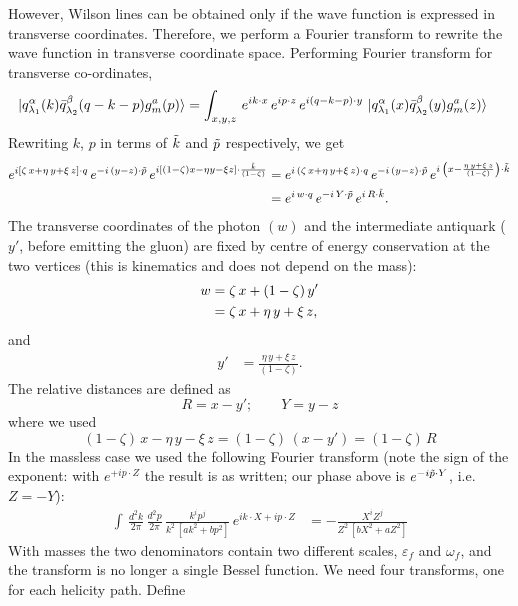 \documentclass[9pt]{article}
\newcommand{\eps}{\varepsilon_{f}}           %
\newcommand{\om}{\omega_{f}}                 %
\numberwithin{equation}{section}
\begin{document}
\begin{enumerate}
However, Wilson lines can be obtained only if the wave function is expressed in transverse coordinates. Therefore, we perform a Fourier transform to rewrite the wave function in transverse coordinate space. Performing Fourier transform for transverse co-ordinates,
\begin{align}
   \ket{q^{\alpha}_{\lambda_{1}}(k)\Bar{q}^{\beta}_{\lambda_{2}}(q-k-p)g^{a}_{m}(p)} & = \int_{x,y,z}\, e^{ik\cdot x}\, e^{ip\cdot z}\, e^{i(q-k-p)\cdot y}\,\ket{q^{\alpha}_{\lambda_{1}}(x)\Bar{q}^{\beta}_{\lambda_{2}}(y)g^{a}_{m}(z)}
\end{align}
Rewriting $k$, $p$ in terms of $\Tilde{k}$ and $\Tilde{p}$ respectively, we get
\begin{align}
    e^{i\left[\zeta\,x +\eta\, y + \xi\,z\right]\cdot q}\,e^{-i\,(y-z)\cdot \Tilde{p}}\, e^{i\left[(1-\zeta)x-\eta y-\xi z\right]\cdot \frac{\Tilde{k}}{(1-\zeta)}} & = e^{i\,\left(\zeta\,x+\eta\,y + \xi\,z\right)\cdot q}\,e^{-i\,(y-z)\cdot \Tilde{p}}\, e^{i\,\left(x-\frac{\eta\,y + \xi\,z}{(1-\zeta)}\right)\cdot \Tilde{k}} \notag \\ & = e^{i\,w\cdot q}\, e^{-i\,Y\cdot \Tilde{p}}\, e^{i\,R\cdot \Tilde{k}}.
\end{align}
The transverse coordinates of the photon $(w)$ and the intermediate antiquark ($y'$, before emitting the gluon) are fixed by centre of energy conservation at the two vertices (this is kinematics and does not depend on the mass):
\begin{align}
    w & = \zeta\,x +(1-\zeta)\,y' \notag \\ & = \zeta\,x + \eta\,y + \xi\,z,
\end{align}
and
\begin{align}
    y' & = \frac{\eta\,y + \xi\,z}{(1-\zeta)}.
\end{align}
The relative distances are defined as
$$R = x - y'; \hspace{2em} Y = y-z$$
where we used
$$(1-\zeta)\,x - \eta\,y -\xi\,z = (1-\zeta)\, (x-y') = (1-\zeta)\,R$$
In the massless case we used the following Fourier transform (note the sign of the exponent: with $e^{+ip\cdot Z}$ the result is as written; our phase above is $e^{-i\Tilde{p}\cdot Y}$, i.e.\ $Z=-Y$):
\begin{align}
    \int\, \frac{d^{2}k}{2\pi}\, \frac{d^{2}p}{2\pi}\, \frac{k^{i}p^{j}}{k^{2}\, \left[ak^{2}+bp^{2}\right]}\,e^{ik\cdot X + ip\cdot Z} & = -\frac{X^{i}Z^{j}}{Z^{2}\,\left[bX^{2}+aZ^{2}\right]}
\end{align}
With masses the two denominators contain two different scales, $\eps$ and $\om$, and the transform is no longer a single Bessel function. We need four transforms, one for each helicity path. Define

\end{enumerate}
\end{document}
